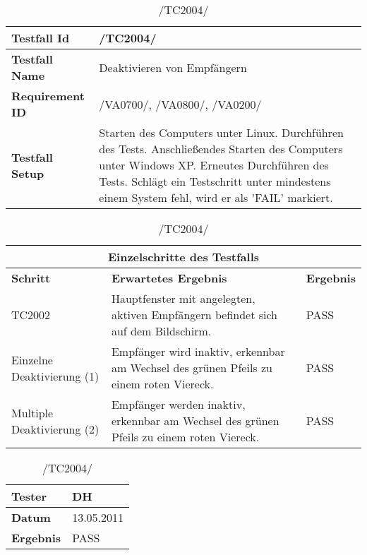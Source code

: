 \begin{table}[h]
\caption{/TC2004/}
\label{tab:TC2004}
\begin{center}
\begin{tabular}{|p{3.5cm}|p{11cm}|}
\hline
\textbf{Testfall Id} & /TC2004/\\
\hline
\textbf{Testfall Name} & Deaktivieren von Empfängern\\
\hline
\textbf{Requirement ID} & /VA0700/, /VA0800/, /VA0200/\\
\hline
\textbf{Testfall Setup} & Starten des Computers unter Linux. Durchführen des Tests.
Anschließendes Starten des Computers unter Windows XP. Erneutes Durchführen des Tests. Schlägt ein Testschritt unter mindestens einem System fehl, wird er als 'FAIL' markiert.\\
\hline
\end{tabular}
\begin{tabular}{|p{4cm}|p{7.8cm}|p{2.3cm}|}
\multicolumn{3}{|c|}{\textbf{Einzelschritte des Testfalls}} \\
\hline
\textbf{Schritt} & \textbf{Erwartetes Ergebnis} & \textbf{Ergebnis}\\
\hline
TC2002 & Hauptfenster mit angelegten,
aktiven Empfängern befindet sich auf dem Bildschirm. & PASS\\
\hline
Einzelne Deaktivierung (1) & Empfänger wird inaktiv,
erkennbar am Wechsel des grünen Pfeils zu einem roten Viereck. & PASS\\
\hline
Multiple Deaktivierung (2) & Empfänger werden
inaktiv, erkennbar am Wechsel des grünen Pfeils zu einem roten Viereck. & PASS\\
\hline
\end{tabular}
\begin{tabular}{|p{3.5cm}|p{11cm}|}
\textbf{Tester} & DH\\
\hline
\textbf{Datum} & 13.05.2011\\
\hline
\textbf{Ergebnis} & PASS\\
\hline
\end{tabular}
\end{center}
\end{table}

